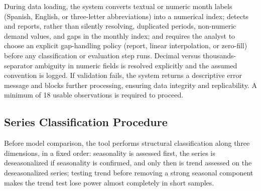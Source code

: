 \documentclass[forecasting,article,submit,pdftex,moreauthors]{Definitions/mdpi}
\begin{document}
During data loading, the system converts textual or numeric month labels (Spanish, English, or three-letter abbreviations) into a numerical index; detects and reports, rather than silently resolving, duplicated periods, non-numeric demand values, and gaps in the monthly index; and requires the analyst to choose an explicit gap-handling policy (report, linear interpolation, or zero-fill) before any classification or evaluation step runs. Decimal versus thousands-separator ambiguity in numeric fields is resolved explicitly and the assumed convention is logged. If validation fails, the system returns a descriptive error message and blocks further processing, ensuring data integrity and replicability. A minimum of 18 usable observations is required to proceed.

\subsection{Series Classification Procedure}
\label{sec:classification}

Before model comparison, the tool performs structural classification along three dimensions, in a fixed order: seasonality is assessed first, the series is deseasonalized if seasonality is confirmed, and only then is trend assessed on the deseasonalized series; testing trend before removing a strong seasonal component makes the trend test lose power almost completely in short samples.
\end{document}
